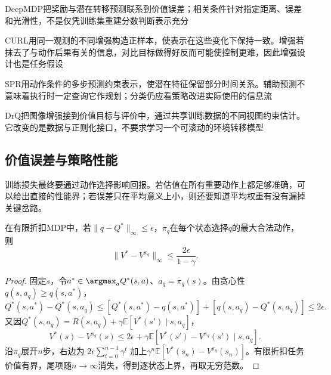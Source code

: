 DeepMDP把奖励与潜在转移预测联系到价值误差；相关条件针对指定距离、误差和光滑性，不是仅凭训练集重建分数判断表示充分

CURL用同一观测的不同增强构造正样本，使表示在这些变化下保持一致。增强若抹去了与动作后果有关的信息，对比目标做得好反而可能使控制更难，因此增强设计也是任务假设

SPR用动作条件的多步预测约束表示，使潜在特征保留部分时间关系。辅助预测不意味着执行时一定查询它作规划；分类仍应看策略改进实际使用的信息流

DrQ把图像增强接到价值目标与评价中，通过共享训练数据的不同视图约束估计。它改变的是数据与正则化接口，不要求学习一个可滚动的环境转移模型

\subsection{价值误差与策略性能}
\label{sec:rl-learning-value-performance}

训练损失最终要通过动作选择影响回报。若估值在所有重要动作上都足够准确，可以给出直接的性能界；若误差只在平均意义上小，则还要知道平均权重有没有漏掉关键岔路。

\begin{theorem}[动作价值误差到贪心策略损失]
  \label{thm:rl-learning-q-performance}
  在有限折扣MDP中，若$\lVert q-Q^*\rVert_\infty\leq\epsilon$，$\pi_q$在每个状态选择$q$的最大合法动作，则
  \begin{equation}
    \lVert V^*-V^{\pi_q}\rVert_\infty
       \leq\frac{2\epsilon}{1-\gamma}.
    \label{eq:rl-learning-q-performance}
  \end{equation}
\end{theorem}
\begin{proof}
  固定$s$，令$a^*\in\argmax_aQ^*(s,a)$、$a_q=\pi_q(s)$。由贪心性$q(s,a_q)\geq q(s,a^*)$，
  \[
    Q^*(s,a^*)-Q^*(s,a_q)
      \leq[Q^*(s,a^*)-q(s,a^*)]
            +[q(s,a_q)-Q^*(s,a_q)]\leq2\epsilon.
  \]
  又因$Q^*(s,a_q)=R(s,a_q)+\gamma\mathbb E[V^*(s')\mid s,a_q]$，
  \[
    V^*(s)-V^{\pi_q}(s)
      \leq2\epsilon+\gamma
          \mathbb E[V^*(s')-V^{\pi_q}(s')\mid s,a_q].
  \]
  沿$\pi_q$展开$n$步，右边为
  $2\epsilon\sum_{t=0}^{n-1}\gamma^t$
  加上$\gamma^n\mathbb E[V^*(s_n)-V^{\pi_q}(s_n)]$。有限折扣任务价值有界，尾项随$n\to\infty$消失，得到逐状态上界，再取无穷范数。
\end{proof}

